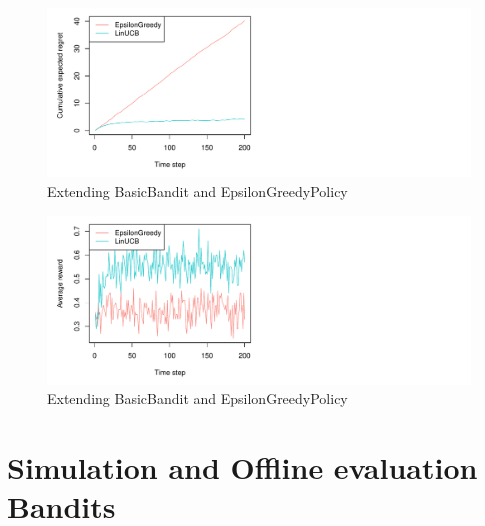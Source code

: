 \documentclass[nojss]{jss}\usepackage[]{graphicx}\usepackage[]{color}
\makeatletter
\def\maxwidth{ %
  \ifdim\Gin@nat@width>\linewidth
    \linewidth
  \else
    \Gin@nat@width
  \fi
}
\newenvironment{kframe}{%
 \def\at@end@of@kframe{}%
 \ifinner\ifhmode%
  \def\at@end@of@kframe{\end{minipage}}%
  \begin{minipage}{\columnwidth}%
 \fi\fi%
 \def\FrameCommand##1{\hskip\@totalleftmargin \hskip-\fboxsep
 \colorbox{shadecolor}{##1}\hskip-\fboxsep
     \hskip-\linewidth \hskip-\@totalleftmargin \hskip\columnwidth}%
 \MakeFramed {\advance\hsize-\width
   \@totalleftmargin\z@ \linewidth\hsize
   \@setminipage}}%
 {\par\unskip\endMakeFramed%
 \at@end@of@kframe}
\newenvironment{knitrout}{}{} %
\makeatother
\begin{document}
\begin{center}
\begin{knitrout}
\color{fgcolor}\begin{kframe}


{\ttfamily\noindent\bfseries{}}\end{kframe}\begin{figure}[H]
\includegraphics[width=\maxwidth,]{fig/fig4-1} \caption[Extending BasicBandit and EpsilonGreedyPolicy]{Extending BasicBandit and EpsilonGreedyPolicy}\label{fig:fig41}
\end{figure}

\begin{figure}[H]
\includegraphics[width=\maxwidth,]{fig/fig4-2} \caption[Extending BasicBandit and EpsilonGreedyPolicy]{Extending BasicBandit and EpsilonGreedyPolicy}\label{fig:fig42}
\end{figure}


\end{knitrout}
\end{center}


\section{Simulation and Offline evaluation Bandits}
\end{document}
